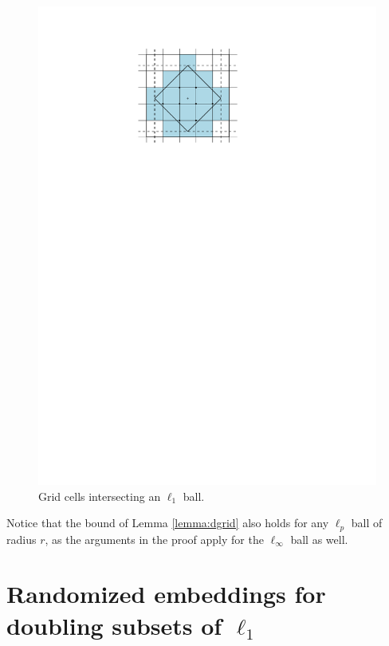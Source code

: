 \documentclass[10pt,a4paper,twoside]{book}
\theoremstyle{definition}
\theoremstyle{remark}
\begin{document}
\begin{figure}[ht]
    \centering
    \includegraphics[scale=0.9]{figures/grid2d.pdf}
    \caption{Grid cells intersecting an $\ell_1$ ball.}
    \label{fig:2dgrid}
\end{figure}

Notice that the bound of Lemma \ref{lemma:dgrid} also holds for any $\ell_p$ ball of radius $r$, as the arguments in the proof apply for the $\ell_{\infty}$ ball as well.

\clearpage
\thispagestyle{empty}
\chapter{Randomized embeddings for doubling subsets of \texorpdfstring{$\ell_1$}{L1}}
\end{document}
